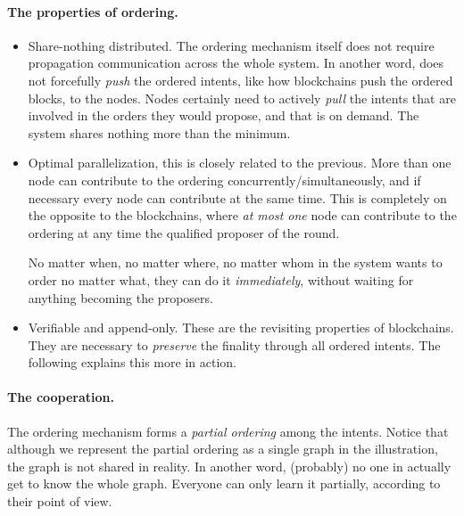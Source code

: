 \paragraph{The properties of ordering.}
\begin{itemize}
    \item Share-nothing distributed.
    The ordering mechanism itself does not require propagation \ie communication across the whole system.
    In another word, \sys does not forcefully \emph{push} the ordered intents, like how blockchains push the ordered blocks, to the nodes.
    Nodes certainly need to actively \emph{pull} the intents that are involved in the orders they would propose, and that is on demand.
    The system shares nothing more than the minimum.
    
    \item Optimal parallelization, this is closely related to the previous.
    More than one node can contribute to the ordering concurrently/simultaneously, and if necessary every node can contribute at the same time.
    This is completely on the opposite to the blockchains, where \emph{at most one} node can contribute to the ordering at any time \ie the qualified proposer of the round.

    No matter when, no matter where, no matter whom in the \sys system wants to order no matter what, they can do it \emph{immediately}, without waiting for anything \eg becoming the proposers.
    
    \item Verifiable and append-only.
    These are the revisiting properties of blockchains.
    They are necessary to \emph{preserve} the finality through all ordered intents.
    The following explains this more in action.
\end{itemize}

\paragraph{The cooperation.}
The ordering mechanism forms a \emph{partial ordering} among the intents.
Notice that although we represent the partial ordering as a single graph in the illustration, the graph is not shared in reality.
In another word, (probably) no one in \sys actually get to know the whole graph.
Everyone can only learn it partially, according to their point of view.

